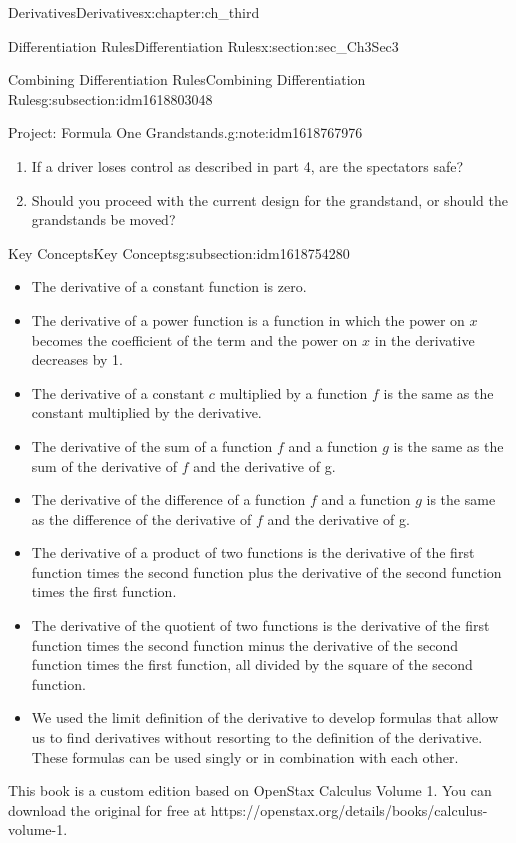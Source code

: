 \documentclass[oneside,10pt,]{book}
\numberwithin{equation}{section}
\begin{document}
\begin{chapterptx}{Derivatives}{}{Derivatives}{}{}{x:chapter:ch_third}
\begin{sectionptx}{Differentiation Rules}{}{Differentiation Rules}{}{}{x:section:sec_Ch3Sec3}
\begin{subsectionptx}{Combining Differentiation Rules}{}{Combining Differentiation Rules}{}{}{g:subsection:idm1618803048}
\begin{note}{Project: Formula One Grandstands.}{g:note:idm1618767976}
\begin{enumerate}
\item{}If a driver loses control as described in part 4, are the spectators safe?%
\item{}Should you proceed with the current design for the grandstand, or should the grandstands be moved?%
\end{enumerate}
\end{note}
\end{subsectionptx}
%
%
\typeout{************************************************}
\typeout{************************************************}
%
\begin{subsectionptx}{Key Concepts}{}{Key Concepts}{}{}{g:subsection:idm1618754280}
%
\begin{itemize}[label=\textbullet]
\item{}The derivative of a constant function is zero.%
\item{}The derivative of a power function is a function in which the power on \(x\) becomes the coefficient of the term and the power on \(x\) in the derivative decreases by 1.%
\item{}The derivative of a constant \(c\) multiplied by a function \(f\) is the same as the constant multiplied by the derivative.%
\item{}The derivative of the sum of a function \(f\) and a function \(g\) is the same as the sum of the derivative of \(f\) and the derivative of g.%
\item{}The derivative of the difference of a function \(f\) and a function \(g\) is the same as the difference of the derivative of \(f\) and the derivative of g.%
\item{}The derivative of a product of two functions is the derivative of the first function times the second function plus the derivative of the second function times the first function.%
\item{}The derivative of the quotient of two functions is the derivative of the first function times the second function minus the derivative of the second function times the first function, all divided by the square of the second function.%
\item{}We used the limit definition of the derivative to develop formulas that allow us to find derivatives without resorting to the definition of the derivative. These formulas can be used singly or in combination with each other.%
\end{itemize}
\end{subsectionptx}
This book is a custom edition based on OpenStax Calculus Volume 1. You can download the original for free at https:\slash{}\slash{}openstax.org\slash{}details\slash{}books\slash{}calculus-volume-1.%

\end{sectionptx}
\end{chapterptx}
\end{document}
